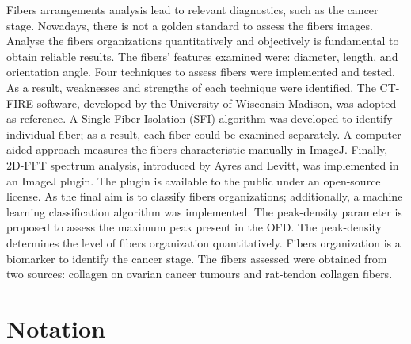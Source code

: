 \documentclass[12pt,a4paper]{article}
\begin{document}
Fibers arrangements analysis lead to relevant diagnostics, such as the cancer stage. Nowadays, there is not a golden standard to assess the fibers images. Analyse the fibers organizations quantitatively and objectively is fundamental to obtain reliable results. The fibers' features examined were: diameter, length, and orientation angle. Four techniques to assess fibers were implemented and tested. As a result, weaknesses and strengths of each technique were identified. The CT-FIRE software, developed by the University of Wisconsin-Madison, was adopted as reference. A Single Fiber Isolation (SFI) algorithm was developed to identify individual fiber; as a result, each fiber could be examined separately.  A computer-aided approach measures the fibers characteristic manually in ImageJ. Finally, 2D-FFT spectrum analysis, introduced by Ayres and Levitt, was implemented in an ImageJ plugin. The plugin is available to the public under an open-source license. As the final aim is to classify fibers organizations; additionally, a machine learning classification algorithm was implemented. 
The peak-density parameter is proposed to assess the maximum peak present in the OFD. The peak-density determines the level of fibers organization quantitatively. Fibers organization is a biomarker to identify the cancer stage. The fibers assessed were obtained from two sources: collagen on ovarian cancer tumours and rat-tendon collagen fibers.
\thispagestyle{empty}
\newpage

\tableofcontents
\thispagestyle{empty}
\newpage
\listoffigures

\listoftables
\thispagestyle{empty}
\newpage

\section*{Notation }
\end{document}
